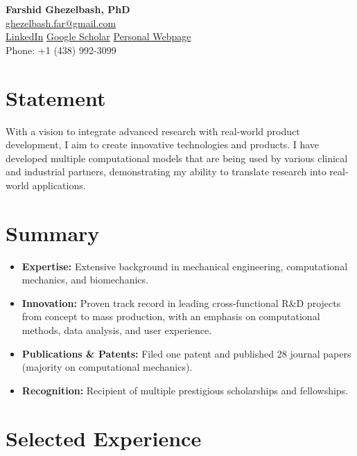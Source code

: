 \documentclass[11pt,a4paper]{article}
\begin{document}
\begin{center}
    {\LARGE \textbf{Farshid Ghezelbash, PhD}}\\
    \vspace{1ex}
    \href{mailto:ghezelbash.far@gmail.com}{ghezelbash.far@gmail.com} \\
    \href{https://www.linkedin.com/in/fred-farshid-ghezelbash-818258206/}{LinkedIn} \textbullet{} 
    \href{https://scholar.google.com/citations?user=Ryg1OQgAAAAJ&hl=en}{Google Scholar} \textbullet{}
    \href{https://sites.google.com/view/farshidghezelbash/home}{Personal Webpage} \\
    Phone: +1 (438) 992-3099 \\
\end{center}

\section*{Statement}
With a vision to integrate advanced research with real-world product development, I aim to create innovative technologies and products. I have developed multiple computational models that are being used by various clinical and industrial partners, demonstrating my ability to translate research into real-world applications.

\section*{Summary}
\begin{itemize}[leftmargin=*, label={}]
    \item \textbf{Expertise:} Extensive background in mechanical engineering, computational mechanics, and biomechanics.
    \item \textbf{Innovation:} Proven track record in leading cross-functional R\&D projects from concept to mass production, with an emphasis on computational methods, data analysis, and user experience.
    \item \textbf{Publications \& Patents:} Filed one patent and published 28 journal papers (majority on computational mechanics).
    \item \textbf{Recognition:} Recipient of multiple prestigious scholarships and fellowships.
\end{itemize}

\section*{Selected Experience}
\end{document}
